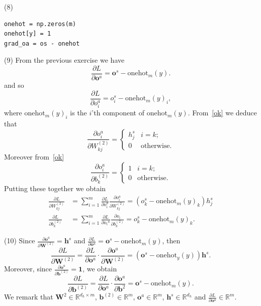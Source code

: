 \documentclass[11pt,english]{article}
\newcommand{\onehot}{\mathrm{onehot}}
\begin{document}
(8) 

\begin{verbatim}
onehot = np.zeros(m)
onehot[y] = 1
grad_oa = os - onehot
\end{verbatim}

(9) From the previous exercise we have 
$$
\frac{\partial L}{\partial\bm{o}^a}=\bm{o}^s-\onehot_m(y).
$$
and so
\begin{equation}\label{oka}
\frac{\partial L}{\partial o_i^a}=o_i^s-{\onehot_m(y)}_i,
\end{equation}
where ${\onehot_m(y)}_i$ is the $i$'th component of $\onehot_m(y)$. 
From~\eqref{ok} we deduce that
$$
\frac{\partial o_i^a}{\partial W_{kj}^{(2)}}=
\begin{cases}
h_j^s &  i=k;\\
0 & \text{otherwise}. 
\end{cases}
$$
Moreover from~\eqref{ok}
\begin{equation}
\frac{\partial o_i^a}{\partial b_k^{(2)}}=\begin{cases}
1 & i=k;\\
0 & \text{otherwise}.
\end{cases}
\end{equation}
Putting these together we obtain 
\begin{equation}
\begin{split}
\frac{\partial L}{\partial W_{kj}^{(2)}}&=\sum_{i=1}^m\frac{\partial L}{\partial o_i^a}\frac{\partial o_i^a}{\partial W_{kj}^{(2)}}=\left(o_k^s-\onehot_m(y)_k\right)h_j^{s}\\[.2cm]
\frac{\partial L}{\partial b_k^{(2)}}&=\sum_{i=1}^m\frac{\partial L}{\partial {o_i}^a}\frac{\partial o_i}{\partial b_k^{(2)}}=o_k^s-\onehot_m(y)_k.
\end{split}
\end{equation} 

(10) Since $\frac{\partial\bm{o}^a}{\partial\bm{W}^{(2)}}=\bm{h}^{s}$ and $\frac{\partial L}{\partial\bm{o}^a}=\bm{o}^s-\onehot_m(y)$, then 
\begin{equation}
\frac{\partial L}{\partial\bm{W}^{(2)}}=\frac{\partial L}{\partial\bm{o}^a}\cdot\frac{\partial\bm{o}^a}{\partial\bm{W}^{(2)}}=(\bm{o}^s-\onehot_y(y))\bm{h}^{s}.
\end{equation}
Moreover, since $\frac{\partial\bm{o}^a}{\partial\bm{b}^{(2)}}=\bm{1}$, we obtain
\begin{equation}
\frac{\partial L}{\partial\bm{b}^{(2)}}=\frac{\partial L}{\partial\bm{o}^a}\cdot\frac{\partial\bm{o}^a}{\partial\bm{b}^{2}}=\bm{o}^s-\onehot_m(y).
\end{equation}
We remark that $\bm{W}^{2}\in\mathbb{R}^{d_h\times m}$, $\bm{b}^{(2)}\in\mathbb{R}^m$, $\bm{o}^a\in \mathbb{R}^m$, $\bm{h}^s\in \mathbb{R}^{d_h}$ and $\frac{\partial L}{\partial\bm{o}^a}\in\mathbb{R}^m$.
\end{document}
